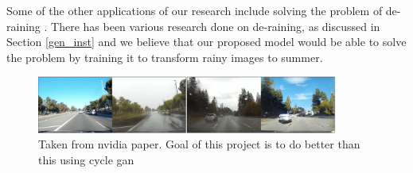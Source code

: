 \documentclass{article}
\begin{document}



Some of the other applications of our research include solving the problem of de-raining . There has been various research 
 done on de-raining, as discussed in Section \ref{gen_inst} and we believe that our proposed model would be able to solve the problem by training it to transform rainy images to summer.

 \begin{figure}[htb!]
  \centering
  \includegraphics[width=99mm]{image.png}
  \caption{Taken from nvidia paper. Goal of this project is to do better 
  than this using cycle gan \label{overflow}}
\end{figure}
\end{document}
